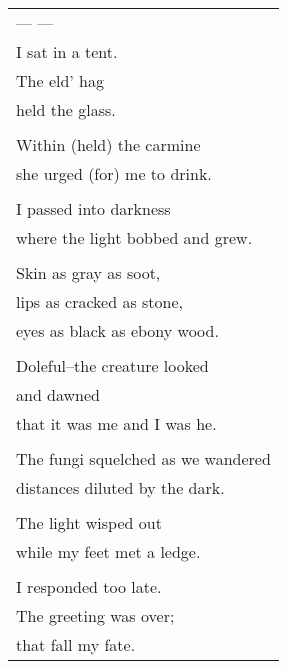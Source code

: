 \documentclass{article}
\begin{document}
\begin{tabular}{l}
\\
--- --- \\
I sat in a tent. \\
The eld' hag \\
held the glass. \\
\\
Within (held) the carmine \\
she urged (for) me to drink. \\
\\
I passed into darkness \\
where the light bobbed and grew. \\
\\
Skin as gray as soot, \\
lips as cracked as stone, \\
eyes as black as ebony wood. \\
\\
Doleful--the creature looked \\
and dawned \\
that it was me and I was he. \\
\\
The fungi squelched as we wandered \\
distances diluted by the dark. \\
\\
The light wisped out \\
while my feet met a ledge. \\
\\
I responded too late. \\
The greeting was over; \\
that fall my fate. \\
\end{tabular} \\
\end{document}
